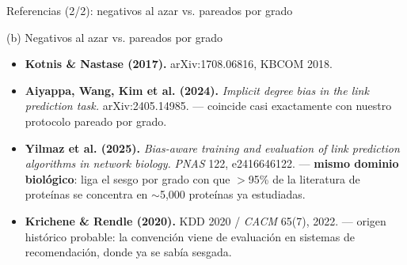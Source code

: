 \begin{frame}{Referencias (2/2): negativos al azar vs. pareados por grado}
  \small
  \begin{block}{(b) Negativos al azar vs. pareados por grado}
    \scriptsize
    \begin{itemize}
      \item \textbf{Kotnis \& Nastase (2017).} arXiv:1708.06816, KBCOM 2018.
      \item \textbf{Aiyappa, Wang, Kim et al. (2024).} \emph{Implicit degree bias in the
            link prediction task.} arXiv:2405.14985. --- coincide casi exactamente con
            nuestro protocolo pareado por grado.
      \item \textbf{Yilmaz et al. (2025).} \emph{Bias-aware training and evaluation of link
            prediction algorithms in network biology.} \emph{PNAS} 122, e2416646122. ---
            \textbf{mismo dominio biol\'ogico}: liga el sesgo por grado con que $>$95\% de
            la literatura de prote\'inas se concentra en $\sim$5{,}000 prote\'inas ya
            estudiadas.
      \item \textbf{Krichene \& Rendle (2020).} KDD 2020 / \emph{CACM} 65(7), 2022. ---
            origen hist\'orico probable: la convenci\'on viene de evaluaci\'on en sistemas
            de recomendaci\'on, donde ya se sab\'ia sesgada.
    \end{itemize}
  \end{block}

  \vspace{0.4em}
\end{frame}
